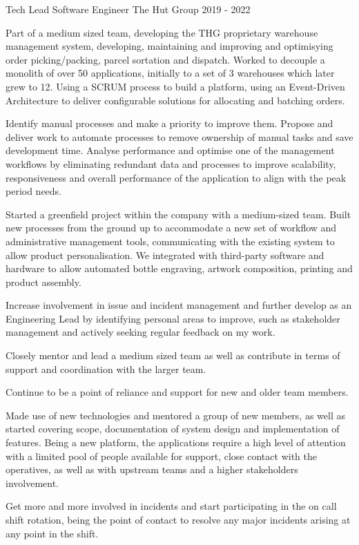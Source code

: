 \begin{cventries}

\cventry
    {Tech Lead Software Engineer} %
    {The Hut Group} %
    {} %
    {2019 - 2022} %
    {
    \begin{cvitems}
        \item{Part of a medium sized team, developing the THG proprietary warehouse management system, developing, maintaining and improving and optimisying order picking/packing, parcel sortation and dispatch. Worked to decouple a monolith of over 50 applications, initially to a set of 3 warehouses which later grew to 12. Using a SCRUM process to build a platform, using an Event-Driven Architecture to deliver configurable solutions for allocating and batching orders.}
        \item{Identify manual processes and make a priority to improve them. Propose and deliver work to automate processes to remove ownership of manual tasks and save development time. Analyse performance and optimise one of the management workflows by eliminating redundant data and processes to improve scalability, responsiveness and overall performance of the application to align with the peak period needs.}
        \item{Started a greenfield project within the company with a medium-sized team. Built new processes from the ground up to accommodate a new set of workflow and administrative management tools, communicating with the existing system to allow product personalisation. We integrated with third-party software and hardware to allow automated bottle engraving, artwork composition, printing and product assembly.}
        \item{Increase involvement in issue and incident management and further develop as an Engineering Lead by identifying personal areas to improve, such as stakeholder management and actively seeking regular feedback on my work.}
        \item{Closely mentor and lead a medium sized team as well as contribute in terms of support and coordination with the larger team.}
        \item{Continue to be a point of reliance and support for new and older team members.}
        \item{Made use of new technologies and mentored a group of new members, as well as started covering scope, documentation of system design and implementation of features. Being a new platform, the applications require a high level of attention with a limited pool of people available for support, close contact with the operatives, as well as with upstream teams and a higher stakeholders involvement.}
        \item{Get more and more involved in incidents and start participating in the on call shift rotation, being the point of contact to resolve any major incidents arising at any point in the shift.}
  \end{cvitems}
  }

\end{cventries}
